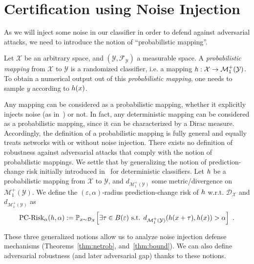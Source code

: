 

\section{Certification using Noise Injection}
As we will inject some noise in our classifier in order to defend against adversarial attacks, we need to introduce the notion of ``probabilistic mapping''.

\begin{definition} Let $\mathcal{X}$ be an arbitrary space, and $(\mathcal{Y},\mathcal{F}_{\mathcal{Y}})$ a measurable space. A \emph{probabilistic mapping} from $\mathcal{X}$ to $\mathcal{Y}$ is a randomized classifier, i.e. a mapping $h: \mathcal{X} \to \mathcal{M}_1^+(\mathcal{Y})$.
To obtain a numerical output out of this \emph{probabilistic mapping}, one needs to sample $y$ according to $h(x)$. %
\end{definition} 

Any mapping can be considered as a probabilistic mapping, whether it explicitly injects noise (as in~\citep{lecuyer2018certified,rakin2018parametricnoiseinjection,pruningDefenseICLR2018}) or not. In fact, any deterministic mapping can be considered as a probabilistic mapping, since it can be characterized by a Dirac measure. Accordingly, the definition of a probabilistic mapping is fully general and equally treats networks with or without noise injection. There exists no definition of robustness against adversarial attacks that comply with the notion of probabilistic mappings. We settle that by generalizing the notion of prediction-change risk initially introduced in~\citep{NIPS2018Mahloujifar} for deterministic classifiers. Let $h$ be a probabilistic mapping from $\mathcal{X}$ to $\mathcal{Y}$, and $d_{\mathcal{M}_1^+(\mathcal{Y})}$ some metric/divergence on $\mathcal{M}_1^+(\mathcal{Y})$. We define the $(\varepsilon,\alpha)$-radius prediction-change risk of $h$ w.r.t. $\mathcal{D}_{\mathcal{X}}$ and $d_{\mathcal{M}_1^+(\mathcal{Y})}$ as 
$$\PCadvRisk(\probmap,\alpha):=  \mathbb{P}_{x\sim \mathcal{D}_{\mathcal{X}}}\left[ \exists \tau \in B(\varepsilon) \text{ s.t. } d_{\mathcal{M}_1^+(\mathcal{Y})}(\probmap(x+\tau),\probmap(x)) > \alpha \right] \enspace.$$

These three generalized notions allow us to analyze noise injection defense mechanisms (Theorems~\ref{thm:netrob}, and~\ref{thm:bound}). We can also define adversarial robustness (and later adversarial gap) thanks to these notions. 


